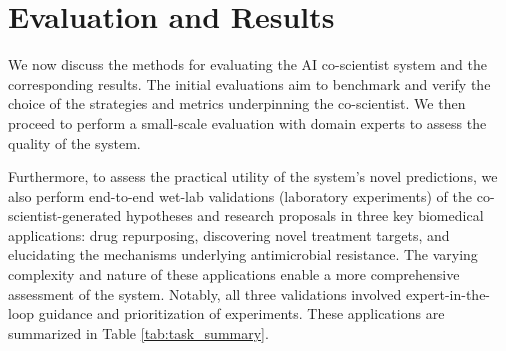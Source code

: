 \section{Evaluation and Results}

We now discuss the methods for evaluating the AI co-scientist system and the corresponding results. The initial evaluations aim to benchmark and verify the choice of the strategies and metrics underpinning the co-scientist. We then proceed to perform a small-scale evaluation with domain experts to assess the quality of the system.

Furthermore, to assess the practical utility of the system's novel predictions, we also perform end-to-end wet-lab validations (laboratory experiments) of the co-scientist-generated hypotheses and research proposals in three key biomedical applications: drug repurposing, discovering novel treatment targets, and elucidating the mechanisms underlying antimicrobial resistance. The varying complexity and nature of these applications enable a more comprehensive assessment of the system. Notably, all three validations involved expert-in-the-loop guidance and prioritization of experiments. These applications are summarized in Table \ref{tab:task_summary}.

\begin{table}[htbp!]
\centering
{}
\vspace{0.1cm}
\caption{{Three real-world applications in biomedicine for end-to-end validation of the AI co-scientist.}}
\label{tab:task_summary}
\end{table}



